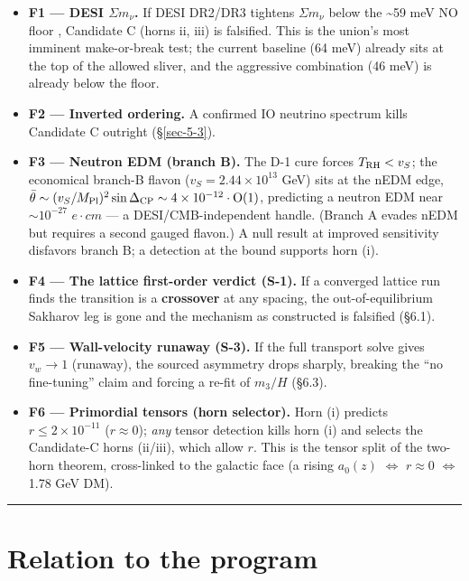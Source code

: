 \documentclass[aps,prd,preprint,nofootinbib,superscriptaddress]{revtex4-2}
\providecommand{\tightlist}{\setlength{\itemsep}{0pt}\setlength{\parskip}{0pt}}
\begin{document}
\begin{itemize}
\tightlist
\item
  \textbf{F1 --- DESI \(\Sigma m_\nu\).} If DESI DR2/DR3 tightens
  \(\Sigma m_\nu\) below the \textasciitilde59 meV NO floor
  \citep{Elbers:2025vlz}, Candidate C (horns ii, iii) is falsified. This
  is the union's most imminent make-or-break test; the current baseline
  (64 meV) already sits at the top of the allowed sliver, and the
  aggressive combination (46 meV) is already below the floor.
\item
  \textbf{F2 --- Inverted ordering.} A confirmed IO neutrino spectrum
  kills Candidate C outright (§\ref{sec-5-3}).
\item
  \textbf{F3 --- Neutron EDM (branch B).} The D-1 cure forces
  \(T_{\rm RH} < v_S\); the economical branch-B flavon
  (\(v_S = 2.44\times10^{13}\) GeV) sits at the nEDM edge,
  \(\bar{\theta} \sim (v_S/M_{\rm Pl})^{2} \sin\Delta_{\rm CP} \sim 4\times10^{-12}\cdot\mathrm{O}(1)\),
  predicting a neutron EDM near \(\sim10^{-27}\) \(e\cdot cm\) --- a
  DESI/CMB-independent handle. (Branch A evades nEDM but requires a
  second gauged flavon.) A null result at improved sensitivity disfavors
  branch B; a detection at the bound supports horn (i).
\item
  \textbf{F4 --- The lattice first-order verdict (S-1).} If a converged
  lattice run finds the transition is a \textbf{crossover} at any
  spacing, the out-of-equilibrium Sakharov leg is gone and the mechanism
  as constructed is falsified (§6.1).
\item
  \textbf{F5 --- Wall-velocity runaway (S-3).} If the full transport
  solve gives \(v_w \to 1\) (runaway), the sourced asymmetry drops
  sharply, breaking the ``no fine-tuning'' claim and forcing a re-fit of
  \(m_3/H\) (§6.3).
\item
  \textbf{F6 --- Primordial tensors (horn selector).} Horn (i) predicts
  \(r \leq 2\times10^{-11}\) (\(r \approx 0\)); \emph{any} tensor
  detection kills horn (i) and selects the Candidate-C horns (ii/iii),
  which allow \(r\). This is the tensor split of the two-horn theorem,
  cross-linked to the galactic face (a rising \(a_0(z)\) \(\iff\)
  \(r \approx 0\) \(\iff\) 1.78 GeV DM).
\end{itemize}

\begin{center}\rule{0.5\linewidth}{0.5pt}\end{center}

\section{Relation to the program}\label{sec-10}
\end{document}
